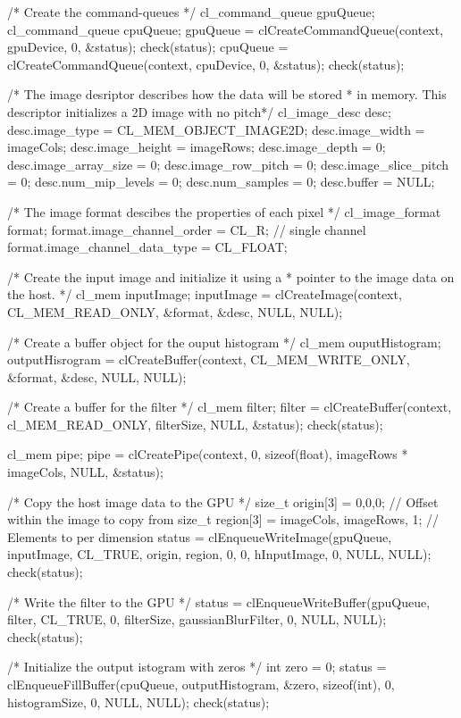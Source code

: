 \begin{codebox}[cpp]
{  /* Create the command-queues */
  cl_command_queue gpuQueue;
  cl_command_queue cpuQueue;
  gpuQueue = clCreateCommandQueue(context, gpuDevice, 0, &status);
  check(status);
  cpuQueue = clCreateCommandQueue(context, cpuDevice, 0, &status);
  check(status);

  /* The image desriptor describes how the data will be stored
   * in memory. This descriptor initializes a 2D image with no pitch*/
  cl_image_desc desc;
  desc.image_type = CL_MEM_OBJECT_IMAGE2D;
  desc.image_width = imageCols;
  desc.image_height = imageRows;
  desc.image_depth = 0;
  desc.image_array_size = 0;
  desc.image_row_pitch = 0;
  desc.image_slice_pitch = 0;
  desc.num_mip_levels = 0;
  desc.num_samples = 0;
  desc.buffer = NULL;

  /* The image format descibes the properties of each pixel */
  cl_image_format format;
  format.image_channel_order = CL_R; // single channel
  format.image_channel_data_type = CL_FLOAT;

  /* Create the input image and initialize it using a
   * pointer to the image data on the host. */
  cl_mem inputImage;
  inputImage = clCreateImage(context, CL_MEM_READ_ONLY, &format, &desc, NULL, NULL);

  /* Create a buffer object for the ouput histogram */
  cl_mem ouputHistogram;
  outputHisrogram = clCreateBuffer(context, CL_MEM_WRITE_ONLY, &format, &desc, NULL, NULL);

  /* Create a buffer for the filter */
  cl_mem filter;
  filter = clCreateBuffer(context, cl_MEM_READ_ONLY, filterSize, NULL, &status);
  check(status);

  cl_mem pipe;
  pipe = clCreatePipe(context, 0, sizeof(float), imageRows * imageCols, NULL, &status);

  /* Copy the host image data to the GPU */
  size_t origin[3] = {0,0,0}; // Offset within the image to copy from
  size_t region[3] = {imageCols, imageRows, 1}; // Elements to per dimension
  status = clEnqueueWriteImage(gpuQueue, inputImage, CL_TRUE, origin, region, 0, 0, hInputImage, 0, NULL, NULL);
  check(status);

  /* Write the filter to the GPU */
  status = clEnqueueWriteBuffer(gpuQueue, filter, CL_TRUE, 0, filterSize, gaussianBlurFilter, 0, NULL, NULL);
  check(status);

  /* Initialize the output istogram with zeros */
  int zero = 0;
  status = clEnqueueFillBuffer(cpuQueue, outputHistogram, &zero, sizeof(int), 0, histogramSize, 0, NULL, NULL);
  check(status);

}
\end{codebox}
